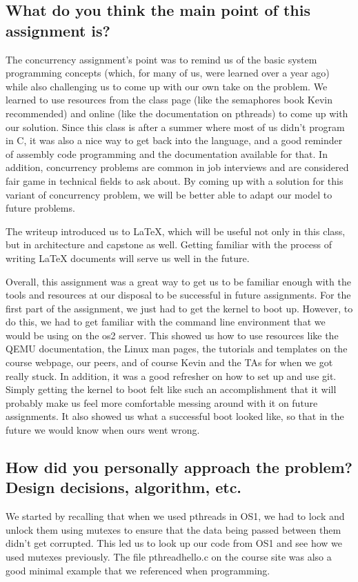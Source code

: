 \documentclass[letterpaper,10pt]{article}
\begin{document}
\subsection{What do you think the main point of this assignment is?}
The concurrency assignment's point was to remind us of the basic system programming concepts (which, for many of us, were learned over a year ago) while also challenging us to come up with our own take on the problem.
We learned to use resources from the class page (like the semaphores book Kevin recommended) and online (like the documentation on pthreads) to come up with our solution.
Since this class is after a summer where most of us didn’t program in C, it was also a nice way to get back into the language, and a good reminder of assembly code programming and the documentation available for that.
In addition, concurrency problems are common in job interviews and are considered fair game in technical fields to ask about.
By coming up with a solution for this variant of concurrency problem, we will be better able to adapt our model to future problems.


The writeup introduced us to LaTeX, which will be useful not only in this class, but in architecture and capstone as well.
Getting familiar with the process of writing LaTeX documents will serve us well in the future.


Overall, this assignment was a great way to get us to be familiar enough with the tools and resources at our disposal to be successful in future assignments.
For the first part of the assignment, we just had to get the kernel to boot up.
However, to do this, we had to get familiar with the command line environment that we would be using on the os2 server.
This showed us how to use resources like the QEMU documentation, the Linux man pages, the tutorials and templates on the course webpage, our peers, and of course Kevin and the TAs for when we got really stuck.
In addition, it was a good refresher on how to set up and use git.
Simply getting the kernel to boot felt like such an accomplishment that it will probably make us feel more comfortable messing around with it on future assignments.
It also showed us what a successful boot looked like, so that in the future we would know when ours went wrong.


\subsection{How did you personally approach the problem? Design decisions, algorithm, etc.}
We started by recalling that when we used pthreads in OS1, we had to lock and unlock them using mutexes to ensure that the data being passed between them didn't get corrupted.
This led us to look up our code from OS1 and see how we used mutexes previously.
The file pthreadhello.c on the course site was also a good minimal example that we referenced when programming.
\end{document}
